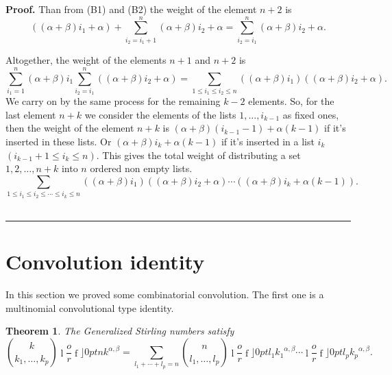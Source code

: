 \documentclass{article}
\newcommand {\lah}[2]{\genfrac\lfloor \rfloor{0pt}{}{#1}{#2}}
\newtheorem{theorem}{Theorem}
\newenvironment{proof}[1][Proof]{\noindent\textbf{#1.} }{\ \rule{0.5em}{0.5em}}
\begin{document}
\begin{proof}
Than from (B1) and (B2) the weight of the element $n+2$ is
  \begin{equation*}
  \left( \left( \alpha +\beta \right) i_{1}+\alpha \right) +\sum_{i_{2}=i_{1}+1}^{n}\left( \alpha +\beta \right)i_{2}+\alpha= \sum_{i_{2}=i_{1}}^{n}\left( \alpha +\beta \right)i_{2}+\alpha.
  \end{equation*}


Altogether, the weight of the elements $n+1$ and $n+2$ is
\begin{equation*}
\sum_{i_{1}=1}^{n}\left(  \alpha +\beta \right) i_{1}\sum_{i_{2}=i_{1}}^{n}\left( \left( \alpha +\beta \right) i_{2}+\alpha
\right) =\sum_{1\leq i_{1}\leq i_{2}\leq n}\left( \left( \alpha
+\beta \right) i_{1}\right) \left( \left( \alpha +\beta \right) i_{2}+\alpha
\right).
\end{equation*}
We carry on by the same process for the remaining $k-2$ elements. So, for
the last element $n+k$ we consider the elements of the lists $1,\ldots
,i_{k-1}$ as fixed ones, then the weight of the element $n+k$ is  $\left( \alpha +\beta \right)
(i_{k-1}-1)+\alpha (k-1)$ if it's inserted in these lists. Or $\left( \alpha +\beta \right) i_{k}+\alpha (k-1)$
if it's inserted in a list $i_{k}$ $\left( i_{k-1}+1\leq i_{k}\leq n\right) $. This gives the total weight of distributing a set $1,2,\ldots,n+k$ into $n$ ordered non empty lists.
\begin{equation*}
\sum_{1\leq i_{1}\leq i_{2}\leq \cdots \leq i_{k}\leq n}\left( \left( \alpha
+\beta \right) i_{1}\right) \left( \left( \alpha +\beta \right) i_{2}+\alpha
\right) \cdots \left( \left( \alpha +\beta \right) i_{k}+\alpha \left(
k-1\right) \right).
\end{equation*}
\end{proof}

\section{Convolution identity}
In this section we proved some combinatorial convolution. The first one is a multinomial convolutional type identity.
\begin{theorem}
The Generalized Stirling numbers satisfy%
\begin{equation*}
\binom{k}{k_{1},\ldots ,k_{p}}\lah{n}{k}^{\alpha ,\beta
}=\sum\limits_{l_{1}+\cdots +l_{p}=n}\binom{n}{l_{1},\ldots ,l_{p}}%
\lah{l_{1}}{k_{1}}^{\alpha ,\beta }\cdots \lah{l_{p}}{k_{p}}^{\alpha ,\beta }.
\end{equation*}
\end{theorem}
\end{document}
